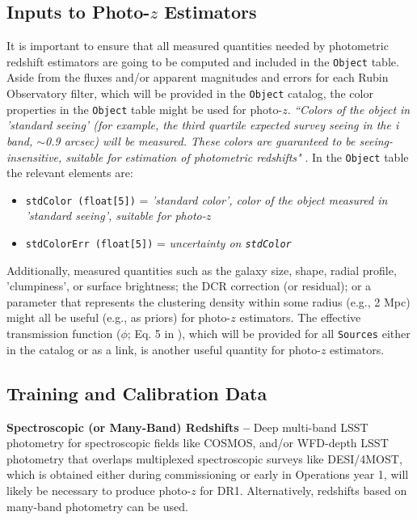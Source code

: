 \documentclass[DM,authoryear,toc]{lsstdoc}
\begin{document}
\subsection{Inputs to Photo-$z$ Estimators}\label{ssec:dp_objvals}

It is important to ensure that all measured quantities needed by photometric redshift estimators are going to be computed and included in the {\tt Object} table. 
Aside from the fluxes and/or apparent magnitudes and errors for each Rubin Observatory filter, which will be provided in the {\tt Object} catalog, the color properties in the {\tt Object} table might be used for photo-$z$. {\it ``Colors of the object in 'standard seeing' (for example, the third quartile expected survey seeing in the i band, $\sim$0.9 arcsec) will be measured. These colors are guaranteed to be seeing-insensitive, suitable for estimation of photometric redshifts"} . In the {\tt Object} table the relevant elements are:
\vspace{-15pt}
\begin{itemize}
\item \texttt{stdColor (float[5])} = {\it 'standard color', color of the object measured in 'standard seeing', suitable for photo-$z$}
\item \texttt{stdColorErr (float[5])} = {\it uncertainty on \texttt{stdColor}}
\end{itemize}

Additionally, measured quantities such as the galaxy size, shape, radial profile, 'clumpiness', or surface brightness; the DCR correction (or residual); or a parameter that represents the clustering density within some radius (e.g., 2 Mpc) might all be useful (e.g., as priors) for photo-$z$ estimators. The effective transmission function ($\phi$; Eq. 5 in ), which will be provided for all {\tt Sources} either in the catalog or as a link, is another useful quantity for photo-$z$ estimators.

\subsection{Training and Calibration Data}\label{ssec:dp_calib}

{\bf Spectroscopic (or Many-Band) Redshifts --}
Deep multi-band LSST photometry for spectroscopic fields like COSMOS, and/or WFD-depth LSST photometry that overlaps multiplexed spectroscopic surveys like DESI/4MOST, which is obtained either during commissioning or early in Operations year 1, will likely be necessary to produce photo-$z$ for DR1.
Alternatively, redshifts based on many-band photometry can be used.
\end{document}
